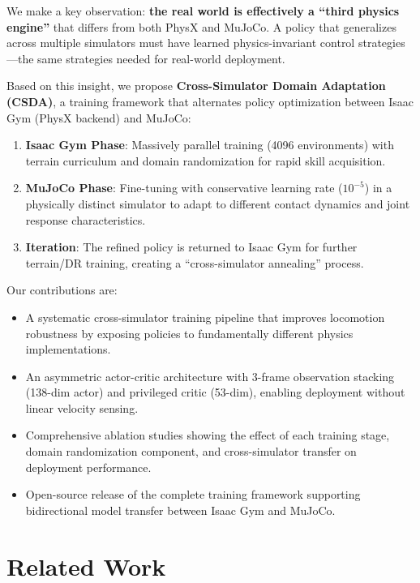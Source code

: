 \documentclass[conference]{IEEEtran}
\begin{document}
We make a key observation: \textbf{the real world is effectively a ``third physics engine''} that differs from both PhysX and MuJoCo. A policy that generalizes across multiple simulators must have learned physics-invariant control strategies---the same strategies needed for real-world deployment.

Based on this insight, we propose \textbf{Cross-Simulator Domain Adaptation (CSDA)}, a training framework that alternates policy optimization between Isaac Gym (PhysX backend) and MuJoCo:

\begin{enumerate}
    \item \textbf{Isaac Gym Phase}: Massively parallel training (4096 environments) with terrain curriculum and domain randomization for rapid skill acquisition.
    \item \textbf{MuJoCo Phase}: Fine-tuning with conservative learning rate ($10^{-5}$) in a physically distinct simulator to adapt to different contact dynamics and joint response characteristics.
    \item \textbf{Iteration}: The refined policy is returned to Isaac Gym for further terrain/DR training, creating a ``cross-simulator annealing'' process.
\end{enumerate}

Our contributions are:
\begin{itemize}
    \item A systematic cross-simulator training pipeline that improves locomotion robustness by exposing policies to fundamentally different physics implementations.
    \item An asymmetric actor-critic architecture with 3-frame observation stacking (138-dim actor) and privileged critic (53-dim), enabling deployment without linear velocity sensing.
    \item Comprehensive ablation studies showing the effect of each training stage, domain randomization component, and cross-simulator transfer on deployment performance.
    \item Open-source release of the complete training framework supporting bidirectional model transfer between Isaac Gym and MuJoCo.
\end{itemize}

\section{Related Work}
\end{document}
